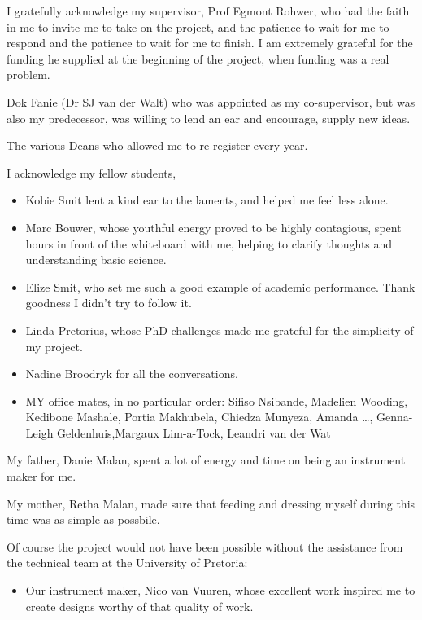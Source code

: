 \documentclass[
11pt, %
english, %
singlespacing, %
headsepline, %
]{MastersDoctoralThesis} %
\begin{document}
\begin{acknowledgements}
\addchaptertocentry{\acknowledgementname} %

I gratefully acknowledge my supervisor, Prof Egmont Rohwer, who had the faith in
me to invite me to take on the project, and the patience to wait for me to
respond and the patience to wait for me to finish. I am extremely grateful for
the funding he supplied at the beginning of the project, when funding was a real
problem.

Dok Fanie (Dr SJ van der Walt) who was appointed as my co-supervisor, but was
also my predecessor, was willing to lend an ear and encourage, supply new ideas.

The various Deans who allowed me to re-register every year. 

I acknowledge my fellow students,
\begin{itemize} \item Kobie Smit lent a kind
ear to the laments, and helped me feel less alone.
\item Marc Bouwer, whose youthful energy proved to be highly contagious, spent
hours in front of the whiteboard with me, helping to clarify thoughts and
understanding basic science.
\item Elize Smit, who set me such a good example of academic performance. Thank goodness I didn't try to follow it. 
\item Linda Pretorius, whose PhD challenges made me grateful for the simplicity of my project. 
\item Nadine Broodryk for all the conversations.
\item MY office mates, in no particular order: Sifiso Nsibande, Madelien Wooding, Kedibone Mashale, Portia
Makhubela, Chiedza Munyeza, Amanda \ldots, Genna-Leigh Geldenhuis,Margaux Lim-a-Tock, Leandri van der Wat
\end{itemize}

My father, Danie Malan, spent a lot of energy and time on being an instrument
maker for me.

My mother, Retha Malan, made sure that feeding and dressing myself during this
time was as simple as possbile.

Of course the project would not have been possible without the assistance from
the technical team at the University of Pretoria:

\begin{itemize}
\item 
Our instrument maker, Nico van Vuuren, whose excellent work inspired me to
create designs worthy of that quality of work.


\end{itemize}
\end{acknowledgements}
\end{document}
